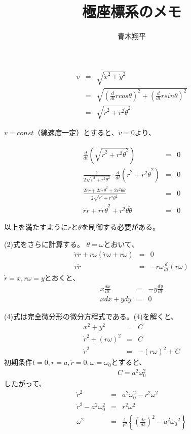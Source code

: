 \documentclass{article}
\title{極座標系のメモ}
\author{青木翔平}
\begin{document}
\maketitle

\begin{eqnarray}
v &=& \sqrt{\dot{x}^2 + \dot{y}^2} \nonumber \\
  &=& \sqrt{ \left(\frac{d}{dt} r cos\theta \right) ^2 + \left(\frac{d}{dt}r sin\theta\right) ^2} \nonumber \\
  &=& \sqrt{ \dot{r}^2+ r^2 \dot{\theta}^2 } 
\end{eqnarray}	
	
$v=const$（線速度一定）とすると、$\dot{v} = 0$より、
	
\begin{eqnarray}
	\frac{d}{dt} \left(\sqrt{ \dot{r}^2+ r^2 \dot{\theta}^2 } \right) &=& 0 \nonumber \\
\frac{1}{2\sqrt{ \dot{r}^2+ r^2 \theta^2 }} \cdot \frac{d}{dt}\left( \dot{r}^2+r^2 \dot{\theta}^2 \right) &=& 0 \nonumber \\ 
\frac{2\dot{r}\ddot{r} + 2r\dot{r}\dot{\theta}^2 + 2r^2\dot{\theta}\ddot{\theta}}{2\sqrt{ \dot{r}^2+ r^2 \theta^2 }} &=& 0 \nonumber \\
\dot{r}\ddot{r} + r\dot{r}\dot{\theta}^2 + r^2\dot{\theta}\ddot{\theta} &=& 0  
\end{eqnarray}
	
以上を満たすように$r$と$\theta$を制御する必要がある。
	
(2)式をさらに計算する。
$\dot{\theta}=\omega$とおいて、
\begin{eqnarray}
  \dot{r}\ddot{r}+r\omega(\dot{r}\omega+r\dot{\omega})&=&0 \nonumber \\
  \dot{r}\ddot{r} &=& -r\omega\frac{d}{dt}(r\omega) 
\end{eqnarray}
$\dot{r}=x, r\omega=y$とおくと、
\begin{eqnarray}
  x\frac{dx}{dt} &=& -y\frac{dy}{dt} \nonumber \\
  xdx + ydy &=& 0	
\end{eqnarray}

(4)式は完全微分形の微分方程式である。(4)を解くと、
\begin{eqnarray}
  x^2+y^2 &=& C  \nonumber \\
  \dot{r}^2 + (r\omega)^2 &=& C \nonumber \\
  \dot{r}^2 &=& -(r\omega)^2 + C 	
\end{eqnarray}
初期条件$t=0, r=a, \dot{r}=0, \omega=\omega_0$とすると、
\begin{eqnarray*}
  C=a^2\omega_0^2	
\end{eqnarray*}
したがって、
\begin{eqnarray}
  \dot{r}^2 &=& a^2 \omega_0^2 - r^2 \omega^2 \nonumber \\
  \dot{r}^2 - a^2 \omega_0^2 &=& r^2 \omega^2 \nonumber \\
  \omega^2 &=& \frac{1}{r^2} \left\{ \left( \frac{dr}{dt} \right)^2 - a^2 {\omega_0}^2  \right\}
\end{eqnarray}
\end{document}
